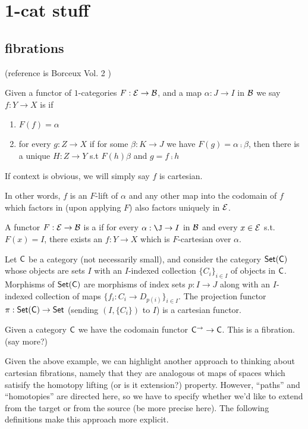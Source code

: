 \documentclass[./main.tex]{subfiles}
\begin{document}
\section{1-cat stuff}
\subsection{fibrations}
(reference is Borceux Vol. 2 \cite{borceuxV2})
\begin{definition}
\label{cartesian-map}
Given a functor of $1$-categories $F: \mathcal{E}\to \mathcal{B}$, and a map $\alpha : J \to I$ in $\mathcal{B}$ we say $f:Y\to X$ is  if
\begin{enumerate}
\item $F(f)=\alpha$
  \item for every $g: Z\to X$ if for some $\beta : K \to J$ we have $F(g)= \alpha\comp \beta$, then there is a unique $H:Z\to Y$ s.t $F(h)\beta$ and $g = f\comp h$
\end{enumerate}
If context is obvious, we will simply say $f$ is cartesian.
\end{definition}
In other words, $f$ is an $F$-lift of $\alpha$ and any other map into the codomain of $f$ which factors in \B (upon applying $F$) also factors uniquely in $\mathcal{E}$.
\begin{definition}
  A functor $F:\mathcal{E} \to \mathcal{B}$ is a  if for every $\alpha: \J \to I$ in $\mathcal{B}$ and every $x\in \mathcal{E}$ s.t. $F(x)= I$, there exists an $f:Y\to X$ which is $F$-cartesian over $\alpha$.
\end{definition}
\begin{xample}
Let $\mathsf{C}$ be a category (not necessarily small), and consider the category $\mathsf{Set}(\mathsf{C})$ whose objects are sets $I$ with an $I$-indexed collection $ \{ C_i\}_{i\in I} $ of objects in $\mathsf{C}$.
Morphisms of $\mathsf{Set}(\mathsf{C})$ are morphisms of index sets $p:I \to J$ along with an $I$-indexed collection of maps $\{f_i:C_i \to D_{p(i)}\}_{i\in I}$.
The projection functor $\pi: \mathsf{Set} (\mathsf{C}) \to \mathsf{Set}$ (sending $(I,\{C_i\})$ to $I$) is a cartesian functor.
\end{xample}

\begin{xample}
  Given a category $\mathsf{C}$ we have the codomain functor $\mathsf{C}^\to \to \mathsf{C}$. This is a fibration.
  (say more?)
\end{xample}
Given the above example, we can highlight another approach to thinking about cartesian fibrations, namely that they are analogous ot maps of spaces which satisify the homotopy lifting (or is it extension?) property.
However, ``paths'' and ``homotopies'' are directed here, so we have to specify whether we'd like to extend from the target or from the source (be more precise here).
The following definitions make this approach more explicit.
\end{document}
